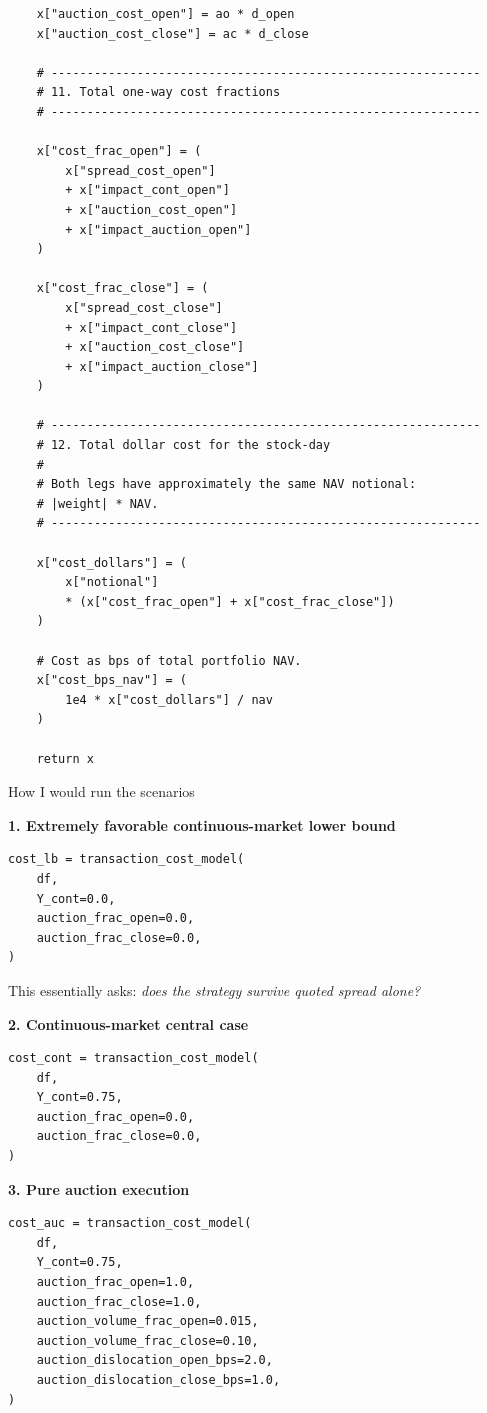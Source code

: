 \begin{verbatim}
    x["auction_cost_open"] = ao * d_open
    x["auction_cost_close"] = ac * d_close

    # ------------------------------------------------------------
    # 11. Total one-way cost fractions
    # ------------------------------------------------------------

    x["cost_frac_open"] = (
        x["spread_cost_open"]
        + x["impact_cont_open"]
        + x["auction_cost_open"]
        + x["impact_auction_open"]
    )

    x["cost_frac_close"] = (
        x["spread_cost_close"]
        + x["impact_cont_close"]
        + x["auction_cost_close"]
        + x["impact_auction_close"]
    )

    # ------------------------------------------------------------
    # 12. Total dollar cost for the stock-day
    #
    # Both legs have approximately the same NAV notional:
    # |weight| * NAV.
    # ------------------------------------------------------------

    x["cost_dollars"] = (
        x["notional"]
        * (x["cost_frac_open"] + x["cost_frac_close"])
    )

    # Cost as bps of total portfolio NAV.
    x["cost_bps_nav"] = (
        1e4 * x["cost_dollars"] / nav
    )

    return x
\end{verbatim}

How I would run the scenarios

\textbf{1. Extremely favorable continuous-market lower bound}

\begin{verbatim}
cost_lb = transaction_cost_model(
    df,
    Y_cont=0.0,
    auction_frac_open=0.0,
    auction_frac_close=0.0,
)
\end{verbatim}

This essentially asks: \emph{does the strategy survive quoted spread alone?}

\textbf{2. Continuous-market central case}

\begin{verbatim}
cost_cont = transaction_cost_model(
    df,
    Y_cont=0.75,
    auction_frac_open=0.0,
    auction_frac_close=0.0,
)
\end{verbatim}

\textbf{3. Pure auction execution}

\begin{verbatim}
cost_auc = transaction_cost_model(
    df,
    Y_cont=0.75,
    auction_frac_open=1.0,
    auction_frac_close=1.0,
    auction_volume_frac_open=0.015,
    auction_volume_frac_close=0.10,
    auction_dislocation_open_bps=2.0,
    auction_dislocation_close_bps=1.0,
)
\end{verbatim}


